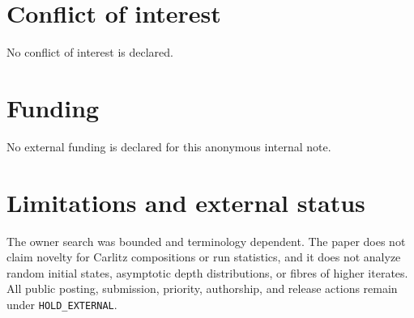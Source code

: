 \documentclass[a4paper,10pt]{amsart}
\theoremstyle{remark}
\begin{document}
\section*{Conflict of interest}
No conflict of interest is declared.

\section*{Funding}
No external funding is declared for this anonymous internal note.

\section*{Limitations and external status}
The owner search was bounded and terminology dependent.  The paper does not
claim novelty for Carlitz compositions or run statistics, and it does not
analyze random initial states, asymptotic depth distributions, or fibres of
higher iterates.  All public posting, submission, priority, authorship, and
release actions remain under \texttt{HOLD\_EXTERNAL}.



\end{document}
